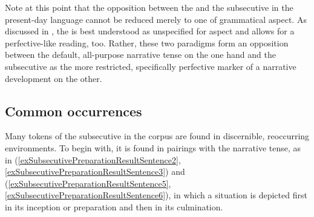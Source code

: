 Note at this point that the opposition between the  and the subsecutive in the present-day language cannot be reduced merely to one of grammatical aspect. As discussed in , the  is best understood as unspecified for aspect and allows for a perfective-like reading, too. Rather, these two paradigms form an opposition between the default, all-purpose narrative tense on the one hand and the subsecutive as the more restricted, specifically perfective marker of a narrative development on the other.

\subsection{Common occurrences}
\label{SubsecutiveCommon}
Many tokens of the subsecutive in the corpus are found in discernible, reoccurring environments. To begin with, it is found in pairings with the narrative tense, as in (\ref{exSubsecutivePreparationResultSentence2}, \ref{exSubsecutivePreparationResultSentence3}) and (\ref{exSubsecutivePreparationResultSentence5}, \ref{exSubsecutivePreparationResultSentence6}), in which a situation is depicted first in its inception or preparation and then in its culmination.


